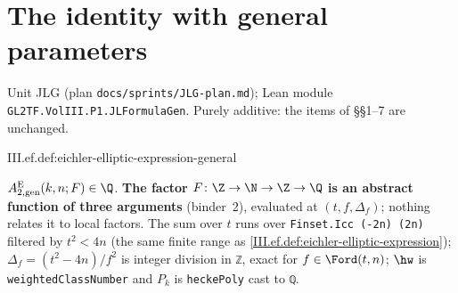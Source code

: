 \section{The identity with general parameters}\label{sec:ef-identity-general}

\noindent Unit JLG (plan \texttt{docs/sprints/JLG-plan.md}); Lean module \texttt{GL2TF.VolIII.P1.JLFormulaGen}. Purely additive: the items of \S\S1--7 are unchanged.

\begin{definition}
\end{definition}
\begin{tfformal}{III.ef.def:eichler-elliptic-expression-general}
\begin{tffidelity}
$A_{2,\mathrm{gen}}^{\mathrm E}(k,n;F)\in\Q$. \textbf{The factor $F\colon\Z\to\N\to\Z\to\Q$ is an abstract function of three arguments} (binder~2), evaluated at $(t,f,\Delta_f)$; nothing relates it to local factors. The sum over $t$ runs over \texttt{Finset.Icc (-2n) (2n)} filtered by $t^2<4n$ (the same finite range as \cref{III.ef.def:eichler-elliptic-expression}); $\Delta_f=(t^2-4n)/f^2$ is integer division in \texttt{ℤ}, exact for $f\in\Ford(t,n)$; $\hw$ is \texttt{weightedClassNumber} and $P_k$ is \texttt{heckePoly} cast to \texttt{ℚ}.
\end{tffidelity}
\end{tfformal}

